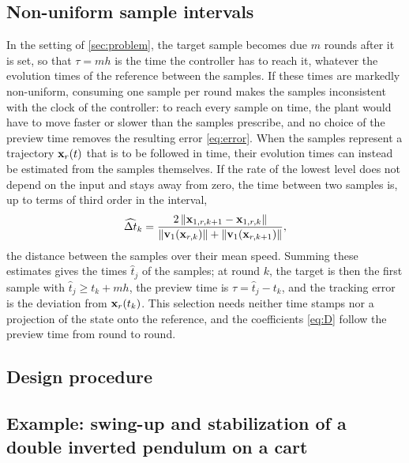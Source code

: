 \subsection{Non-uniform sample intervals}\label{sec:nonuniform}

In the setting of \cref{sec:problem}, the target sample becomes due $m$ rounds after it is set, so
that $\tau = mh$ is the time the controller has to reach it, whatever the evolution times of the
reference between the samples.
If these times are markedly non-uniform, consuming one sample per round makes the samples
inconsistent with the clock of the controller: to reach every sample on time, the plant would have
to move faster or slower than the samples prescribe, and no choice of the preview time removes the
resulting error \eqref{eq:error}.
When the samples represent a trajectory $\mathbf{x}_r(t)$ that is to be followed in time, their evolution
times can instead be estimated from the samples themselves.
If the rate of the lowest level does not depend on the input and stays away from zero, the time
between two samples is, up to terms of third order in the interval,
\begin{equation}\label{eq:interval}
    \widehat{\Delta t}_k = \frac{2\,\lVert\mathbf{x}_{1,r,k+1} - \mathbf{x}_{1,r,k}\rVert}
        {\lVert\mathbf{v}_1(\mathbf{x}_{r,k})\rVert + \lVert\mathbf{v}_1(\mathbf{x}_{r,k+1})\rVert},
\end{equation}
the distance between the samples over their mean speed.
Summing these estimates gives the times $\hat t_j$ of the samples; at round $k$, the target is then the
first sample with $\hat t_j \ge t_k + mh$, the preview time is $\tau = \hat t_j - t_k$, and the
tracking error is the deviation from $\mathbf{x}_r(t_k)$.
This selection needs neither time stamps nor a projection of the state onto the reference, and the
coefficients \eqref{eq:D} follow the preview time from round to round.

\subsection{Design procedure}\label{sec:procedure}


\subsection{Example: swing-up and stabilization of a double inverted pendulum on a cart}
\label{sec:example-dipc}

